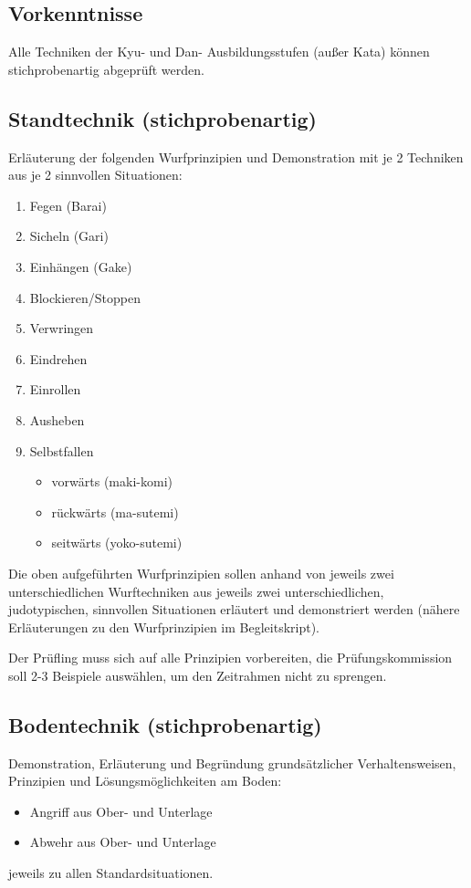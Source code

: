 \documentclass[justified, a4paper, notitlepage, captions=tableheading, nobib]{tufte-handout}
\begin{document}
\subsection{Vorkenntnisse}
\label{sec:orgfda6b40}
Alle Techniken der Kyu- und Dan- Ausbildungsstufen (außer Kata) können stichprobenartig abgeprüft werden.

\subsection{Standtechnik (stichprobenartig)}
\label{sec:orgacb8c9c}
Erläuterung der folgenden Wurfprinzipien und Demonstration mit je 2 Techniken aus je 2 sinnvollen Situationen:
\begin{enumerate}
\item Fegen (Barai)
\item Sicheln (Gari)
\item Einhängen (Gake)
\item Blockieren/Stoppen
\item Verwringen
\item Eindrehen
\item Einrollen
\item Ausheben
\item Selbstfallen
\begin{itemize}
\item vorwärts (maki-komi)
\item rückwärts (ma-sutemi)
\item seitwärts (yoko-sutemi)
\end{itemize}
\end{enumerate}

Die oben aufgeführten Wurfprinzipien sollen anhand von jeweils zwei unterschiedlichen Wurftechniken aus jeweils zwei unterschiedlichen, judotypischen, sinnvollen Situationen erläutert und demonstriert werden (nähere Erläuterungen zu den Wurfprinzipien im Begleitskript).

Der Prüfling muss sich auf alle Prinzipien vorbereiten, die Prüfungskommission soll 2-3 Beispiele auswählen, um den Zeitrahmen nicht zu sprengen.

\subsection{Bodentechnik (stichprobenartig)}
\label{sec:org4f6be60}
Demonstration, Erläuterung und Begründung grundsätzlicher Verhaltensweisen, Prinzipien und Lösungsmöglichkeiten am Boden:
\begin{itemize}
\item Angriff aus Ober- und Unterlage
\item Abwehr aus Ober- und Unterlage
\end{itemize}
jeweils zu allen Standardsituationen.
\end{document}
